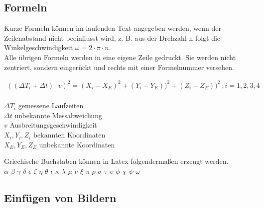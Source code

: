 \newpage
\subsection{Formeln}

Kurze Formeln können im laufenden Text angegeben werden, wenn der Zeilenabstand nicht beeinflusst wird, z. B. aus der Drehzahl n folgt die Winkelgeschwindigkeit $\omega = 2 \cdot \pi \cdot n$.\\

Alle übrigen Formeln werden in eine eigene Zeile gedruckt. Sie werden nicht zentriert, sondern eingerückt und rechts mit einer Formelnummer versehen.

\begin{align}
((\Delta T_i +\Delta t) \cdot v)^2  = (X_i -X_E)^2+(Y_i -Y_E))^2+(Z_i -Z_E))^2 \  ; i=1,2,3,4 
\end{align}\\

\hspace*{12mm}$\Delta T_i$ \hspace{2,2cm} gemessene Laufzeiten \\
\hspace*{12mm}$\Delta t$ \hspace{2,4cm} unbekannte Messabweichung\\
\hspace*{12mm}$v$ \hspace{2,6cm} Ausbreitungsgeschwindigkeit\\
\hspace*{12mm}$X_i,Y_i,Z_i$ \hspace{1,3cm} bekannten Koordinaten\\
\hspace*{12mm}$X_E,Y_E,Z_E$ \hspace{1cm} unbekannte Koordinaten\\

\vspace{1.0cm}


Griechische Buchstaben können in Latex folgendermaßen erzeugt werden. \\

$\alpha$ $\beta$ $\gamma$ $\delta$ $\epsilon$ $\zeta$ $\eta$ $\theta$ $\iota$ $\kappa$ $\lambda$ $\mu$ $\nu$ $\xi$ $\pi$ $\rho$ $\sigma$ $\tau$ $\upsilon$ $\phi$ $\chi$ $\psi$ $\omega$ \\

\newpage


\subsection{Einfügen von Bildern}


